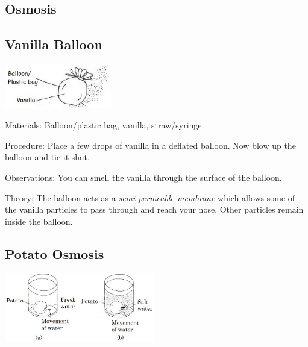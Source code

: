 \begin{multicols}{2}
\columnbreak


\section*{Osmosis}


\subsection{Vanilla Balloon}

\begin{center}
\includegraphics[width=0.35\textwidth]{./img/vso/osmosis-vanilla.jpg}
\end{center}

\begin{description*}
\item[Materials:]{Balloon/plastic bag, vanilla, straw/syringe}
\item[Procedure:]{Place a few drops of vanilla in a deflated balloon. Now blow up the balloon and tie it shut.}
\item[Observations:]{You can smell the vanilla through the surface of the balloon.}
\item[Theory:]{The balloon acts as a \emph{semi-permeable membrane} which allows some of the vanilla particles to pass through and reach your nose. Other particles remain inside the balloon.}
\end{description*}

\subsection{Potato Osmosis}

\begin{center}
\includegraphics[width=0.49\textwidth]{./img/vso/osmosis-potato-full.jpg}
\end{center}


\end{multicols}
